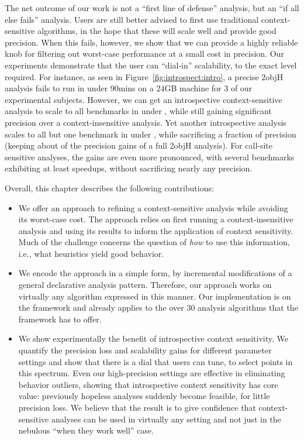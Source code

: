 The net outcome of our work is not a ``first line of defense'' analysis, but an ``if all else fails'' analysis. Users are still better advised to first use traditional context-sensitive algorithms, in the hope that these will scale well and provide good precision. When this fails, however, we show that we can provide a highly reliable knob for filtering out worst-case performance at a small cost in precision. Our experiments demonstrate that the user can ``dial-in'' scalability, to the exact level required. For instance, as seen in Figure~\ref{fig:introspect:intro}, a precise 2objH analysis fails to run in under 90mins on a 24GB machine for 3 of our experimental subjects. However, we can get an introspective context-sensitive analysis to scale to all benchmarks in under , while still gaining significant precision over a context-insensitive analysis. Yet another introspective analysis scales to all but one benchmark in under , while sacrificing a fraction of precision (keeping about  of the precision gains of a full 2objH analysis). For call-site sensitive analyses, the gains are even more pronounced, with several benchmarks exhibiting at least  speedups, without sacrificing nearly any precision.

Overall, this chapter describes the following contributions:

\begin{itemize}
\item We offer an approach to refining a context-sensitive analysis while avoiding its worst-case cost. The approach relies on first running a context-insensitive analysis and using its results to inform the application of context sensitivity. Much of the challenge concerns the question of \emph{how} to use this information, i.e., what heuristics yield good behavior.

\item We encode the approach in a simple form, by incremental modifications of a general declarative analysis pattern. Therefore, our approach works on virtually any algorithm expressed in this manner. Our implementation is on the \doop{} framework and already applies to the over 30 analysis algorithms that the framework has to offer.

\item We show experimentally the benefit of introspective context sensitivity. We quantify the precision loss and scalability gains for different parameter settings and show that there is a dial that users can tune, to select points in this spectrum. Even our high-precision settings are effective in eliminating behavior outliers, showing that introspective context sensitivity has core value: previously hopeless analyses suddenly become feasible, for little precision loss. We believe that the result is to give confidence that context-sensitive analyses can be used in virtually any setting and not just in the nebulous ``when they work well'' case.
\end{itemize}

